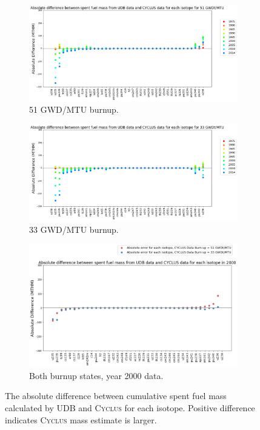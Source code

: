 \documentclass{anstrans}
\newcommand{\Cyclus}{\textsc{Cyclus}\xspace}%
\begin{document}
\begin{figure}[htb] %
	\centering
        \begin{subfigure}{0.9\textwidth}
        \includegraphics[height=0.30\textheight]{../figures/absolute_diff_all_51}
        \caption{51 GWD/MTU burnup.}
	\label{fig:absolute_diff_all_51}
        \end{subfigure}
        \begin{subfigure}{0.9\textwidth}
        \includegraphics[height=0.30\textheight]{../figures/absolute_diff_all_33}
        \caption{33 GWD/MTU burnup.}
	\label{fig:absolute_diff_all_33}
        \end{subfigure}
        \begin{subfigure}{0.9\textwidth}
        \includegraphics[height=0.35\textheight]{../figures/absolute_diff_2000}
        \caption{Both burnup states, year 2000 data.}
	\label{fig:absolute_diff_2000}
        \end{subfigure}
        \caption{The absolute difference between cumulative spent fuel mass calculated by 
        \gls{UDB} and \Cyclus for each isotope. Positive difference indicates \Cyclus 
        mass estimate is larger.}
        \label{fig:absolute}
\end{figure} 
\FloatBarrier
\end{document}
